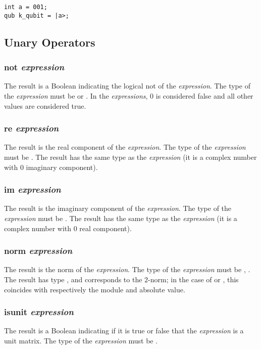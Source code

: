 \begin{verbatim}
int a = 001;
qub k_qubit = |a>;
\end{verbatim}

\subsection{Unary Operators}
\subsubsection{not \textit{expression}}
The result is a Boolean indicating the logical \textsf{not} of the \textit{expression}. The type of the \textit{expression} must be \integ or \float. In the \textit{expressions}, 0 is considered false and all other values are considered true.
\subsubsection{re \textit{expression}}
The result is the real component of the \textit{expression}. The type of the \textit{expression} must be  \complex. The result has the same type as the \textit{expression} (it is a complex number with  0 imaginary component).
\subsubsection{im \textit{expression}}
The result is the imaginary component of the \textit{expression}. The type of the \textit{expression} must be  \complex. The result has the same type as the \textit{expression} (it is a complex number with  0 real component).
\subsubsection{norm \textit{expression}}
The result is the norm of the \textit{expression}. The type of the \textit{expression} must be \mat, . The result has type \float, and corresponds to the $2$-norm; in the case of \complex or \float, this coincides with respectively the module and absolute value.
\subsubsection{isunit \textit{expression}}
The result is a Boolean indicating if it is true or false that the \textit{expression} is a unit matrix. The type of the \textit{expression} must be \mat.
